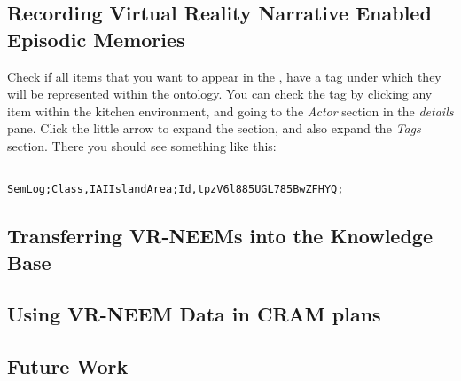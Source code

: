 \subsection{Recording Virtual Reality Narrative Enabled Episodic Memories}
Check if all items that you want to appear in the \neems, have a tag under which they will be represented within the ontology. You can check the tag by clicking any item within the kitchen environment, and going to the \textit{Actor} section in the \textit{details} pane. Click the little arrow to expand the section, and also expand the \textit{Tags} section. There you should see something like this:

\begin{lstlisting}

SemLog;Class,IAIIslandArea;Id,tpzV6l885UGL785BwZFHYQ;

\end{lstlisting}


\subsection{Transferring VR-NEEMs into the Knowledge Base}

\subsection{Using VR-NEEM Data in CRAM plans}

\subsection{Future Work}


